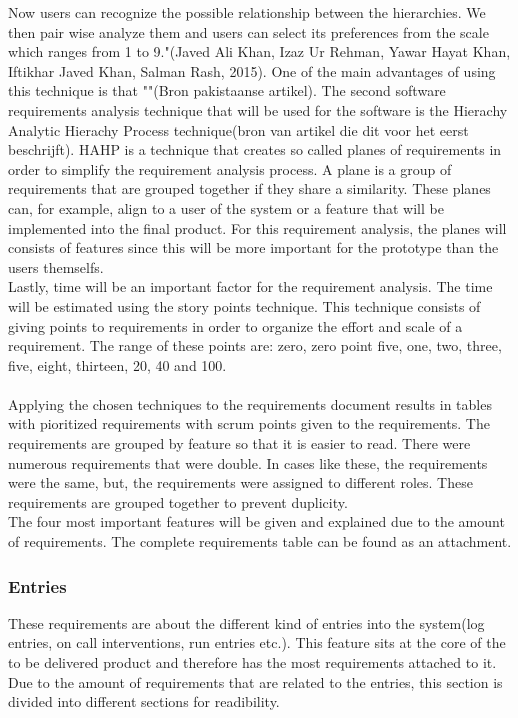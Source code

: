 \documentclass[paper=a4, fontsize=11pt,twoside]{scrartcl}	%
\begin{document}
Now users can recognize the possible relationship between 
the hierarchies. We then pair wise analyze them and users can select its preferences from the scale which ranges from 
1 to 9."(Javed Ali Khan, Izaz Ur Rehman, Yawar Hayat Khan, Iftikhar Javed Khan, Salman Rash, 2015). One of the main advantages of using this technique is that ""(Bron pakistaanse artikel). The second software requirements analysis technique that will be used for the software is the Hierachy Analytic Hierachy Process technique(bron van artikel die dit voor het eerst beschrijft). HAHP is a technique that creates so called planes of requirements in order to simplify the requirement analysis process. A plane is a group of requirements that are grouped together if they share a similarity. These planes can, for example, align to a user of the system or a feature that will be implemented into the final product. For this requirement analysis, the planes will consists of features since this will be more important for the prototype than the users themselfs. \\
Lastly, time will be an important factor for the requirement analysis. The time will be estimated using the story points technique. This technique consists of giving  points to requirements in order to organize the effort and scale of a requirement. The range of these points are:  zero, zero point five, one, two, three, five, eight, thirteen, 20, 40 and 100. \\ \\
Applying the chosen techniques to the requirements document results in tables with pioritized requirements with scrum points given to the requirements. The requirements are grouped by feature so that it is easier to read. There were numerous requirements that were double. In cases like these, the requirements were the same, but, the requirements were assigned to different roles. These requirements are grouped together to prevent duplicity. \\
The four most important features will be given and explained due to the amount of requirements. The complete requirements table can be found as an attachment.\\

\subsubsection{Entries}
These requirements are about the different kind of entries into the system(log entries, on call interventions, run entries etc.). This feature sits at the core of the to be delivered product and therefore has the most requirements attached to it. Due to the amount of requirements that are related to the entries, this section is divided into different sections for readibility. 
\end{document}
